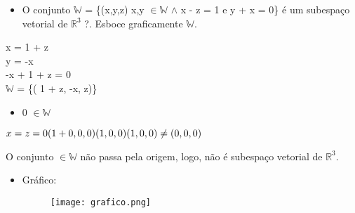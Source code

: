 \documentclass{article}
\begin{document}
\begin{itemize}
  
    \item O conjunto $\mathbb{W}$ = \{(x,y,z) x,y $\in \mathbb{W}$ $\land$ x - z = 1 e y + x = 0\} é um subespaço vetorial de $\mathbb{R}^3$ ?. Esboce graficamente $\mathbb{W}$.\\
    \end{itemize}
\newline

x = 1 + z\\
y = -x\\
-x + 1 + z = 0\\
\newline
$\mathbb{W}$ = \{( 1 + z, -x, z)\}\\
\newline

\begin{itemize}
     
    \item 0 $\in \mathbb{W}$\\
 \end{itemize}  
 
$
\newline
x = z = 0\\
(1 + 0,0,0)\\
(1,0,0)\\
(1,0,0) \ne (0,0,0)\\$
\newline

O conjunto $\in\mathbb{W}$ não passa pela origem, logo, não é subespaço vetorial de $\mathbb{R}^3$.\\
\newline
\begin{itemize}
      
    \item Gráfico:\\
\newline

\begin{figure}[h]
    \centering
    \texttt{[image: grafico.png]}
    \caption{}
    \label{fig:my_label}
\end{figure}

\end{itemize}
\end{document}
